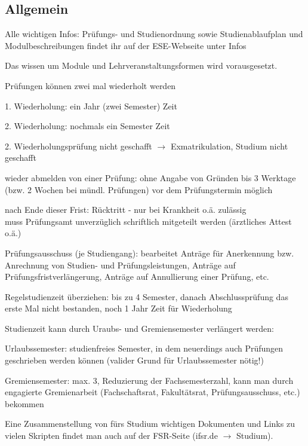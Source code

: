 \documentclass[a4paper,12pt]{report}
\begin{document}
\subsection{Allgemein}
\begin{itemize*}
	\item Alle wichtigen Infos: Prüfungs- und Studienordnung sowie Studienablaufplan und Modulbeschreibungen findet ihr auf der ESE-Webseite unter Infos
	\item Das wissen um Module und Lehrveranstaltungsformen wird vorausgesetzt.
	\item Prüfungen können zwei mal wiederholt werden
		\begin{itemize*}
			\item 1. Wiederholung: ein Jahr (zwei Semester) Zeit
			\item 2. Wiederholung: nochmals ein Semester Zeit
		\end{itemize*}
		2. Wiederholungsprüfung nicht geschafft $\rightarrow$ Exmatrikulation, Studium nicht geschafft
	\item wieder abmelden von einer Prüfung: ohne Angabe von Gründen bis 3 Werktage (bzw. 2 Wochen bei mündl. Prüfungen) vor dem Prüfungstermin möglich
	\item nach Ende dieser Frist: Rücktritt - nur bei Krankheit o.ä. zulässig\\ 
		muss Prüfungsamt unverzüglich schriftlich mitgeteilt werden (ärztliches Attest o.ä.)
	\item Prüfungsausschuss (je Studiengang): bearbeitet Anträge für Anerkennung bzw. Anrechnung von Studien- und Prüfungsleistungen, Anträge auf Prüfungsfristverlängerung, Anträge auf Annullierung einer Prüfung, etc.
	\item Regelstudienzeit überziehen: bis zu 4 Semester, danach Abschlussprüfung das erste Mal nicht bestanden, noch 1 Jahr Zeit für Wiederholung
	\item Studienzeit kann durch Uraubs- und Gremiensemester verlängert werden:
		\begin{itemize*}
			\item Urlaubssemester: studienfreies Semester, in dem neuerdings auch Prüfungen geschrieben werden können (valider Grund für Urlaubssemester nötig!)
			\item Gremiensemester: max. 3, Reduzierung der Fachsemesterzahl, kann man durch engagierte Gremienarbeit (Fachschaftsrat, Fakultätsrat, Prüfungsausschuss, etc.) bekommen
		\end{itemize*}	
\end{itemize*}
Eine Zusammenstellung von fürs Studium wichtigen Dokumenten und Links zu vielen Skripten findet man auch auf der FSR-Seite (ifsr.de $\rightarrow$ Studium).
\end{document}
